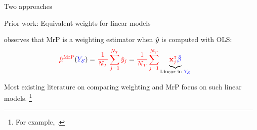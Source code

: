 \begin{frame}[t]{Two approaches}
\end{frame}



\begin{frame}{Prior work: Equivalent weights for linear models}

\textcite{gelman:2007:struggles} observes that MrP is a weighting estimator when
$\hat{y}$ is computed with OLS:
$$
\begin{aligned}
\textcolor{red}{\hat{\mu}^{\mathrm{MrP}}}(\textcolor{blue}{\textcolor{blue}{Y_{\mathcal{S}}}}) ={}& \textcolor{red}{\frac{1}{{\textcolor{red}{N_T}}} \sum_{j=1}^{\textcolor{red}{N_T}} \hat{y}_j} =
\textcolor{red}{\frac{1}{{\textcolor{red}{N_T}}} \sum_{j=1}^{\textcolor{red}{N_T}} }
\underbrace{\textcolor{red}{\mathbf{x}_j^\intercal} \textcolor{blue}{\hat{\beta}}}_{\textrm{Linear in }\textcolor{blue}{\textcolor{blue}{Y_{\mathcal{S}}}}}
\end{aligned}
$$

Most existing literature on comparing weighting and MrP focus on such linear models.
\footnote{
    For example,
    \textcite{gelman:2007:struggles,benmichael:2021:multilevel,chattopadhyay:2023:implied}.}

\vspace{1em}

\end{frame}







